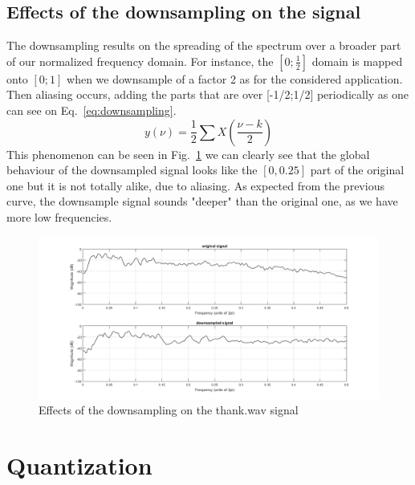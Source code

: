 \documentclass[a4paper,twocolumn]{article}
\begin{document}
\subsection{Effects of the downsampling on the signal}
The downsampling results on the spreading of the spectrum over a broader part of our normalized frequency domain. For instance, the $[0;\frac{1}{2}]$ domain is mapped onto $[0;1]$ when we downsample of a factor 2 as for the considered application. Then aliasing occurs, adding the parts that are over [-1/2;1/2] periodically as one can see on Eq.~\ref{eq:downsampling}. 
\begin{equation}
  \label{eq:downsampling}
y(\nu)=\frac{1}{2}\sum X\left(\frac{\nu-k}{2}\right)
\end{equation}
This phenomenon can be seen in Fig.~\ref{fig:downsampling} we can clearly see that the global behaviour of the downsampled signal looks like the $[0,0.25]$ part of the original one but it is not totally alike, due to aliasing. As expected from the previous curve, the downsample signal sounds "deeper" than the original one, as we have more low frequencies.

\begin{figure}[!ht]
  \begin{center}
    \includegraphics[width=1.1\columnwidth]{downsampling.png}
  \end{center}
  \caption{Effects of the downsampling on the thank.wav signal}
  \label{fig:downsampling}
\end{figure}





\section{Quantization}
\label{sec:quantization}
\end{document}
